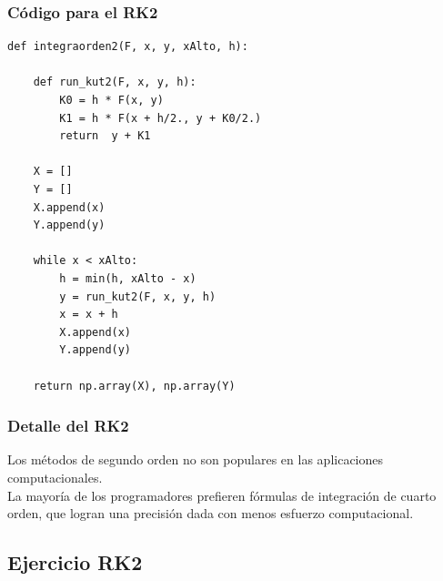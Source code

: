 \documentclass[12pt]{beamer}
\begin{document}
\begin{frame}
\frametitle{Código para el RK2}
\begin{lstlisting}[caption=Código que utiliza el método de RK2]
def integraorden2(F, x, y, xAlto, h):

    def run_kut2(F, x, y, h):
        K0 = h * F(x, y)
        K1 = h * F(x + h/2., y + K0/2.)
        return  y + K1
    
    X = []
    Y = []
    X.append(x)
    Y.append(y)
    
    while x < xAlto:
        h = min(h, xAlto - x)
        y = run_kut2(F, x, y, h)
        x = x + h
        X.append(x)
        Y.append(y)
    
    return np.array(X), np.array(Y)
\end{lstlisting}
\end{frame}
\begin{frame}
\frametitle{Detalle del RK2}
Los métodos de segundo orden no son populares en las aplicaciones computacionales.
\\
\bigskip
\pause
La mayoría de los programadores prefieren \textcolor{brown(web)}{fórmulas de integración de cuarto orden}, que logran una precisión dada con menos esfuerzo computacional.
\end{frame}

\subsection{Ejercicio RK2}
\end{document}

